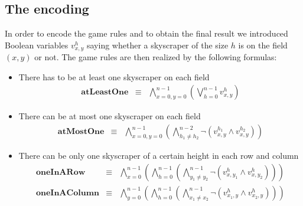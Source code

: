 \documentclass[a4paper, 12pt, titlepage]{article}
\begin{document}
\subsection{The encoding}
In order to encode the game rules and to obtain the final result we introduced Boolean variables $v_{x,y}^h$ saying whether a skyscraper of the size $h$ is on the field $(x,y)$ or not. The game rules are then realized by the following formulas:
	\begin{itemize}
		\item There has to be at least one skyscraper on each field
			\begin{eqnarray}
				\pmb{atLeastOne}&\equiv&\bigwedge_{x=0,y=0}^{n-1} \left(\bigvee_{h=0}^{n-1} v_{x,y}^h \right)
			\end{eqnarray}
		\item There can be at most one skyscraper on each field
			\begin{eqnarray}
				\pmb{atMostOne}&\equiv&\bigwedge_{x=0,y=0}^{n-1} \left( \bigwedge_{h_1\not=h_2}^{n-2}\neg(v_{x,y}^{h_1} \wedge v_{x,y}^{h_2})  \right)
			\end{eqnarray}
		\item There can be only one skyscraper of a certain height in each row and column
			\begin{eqnarray}
				\pmb{oneInARow} &\equiv& \bigwedge_{x=0}^{n-1} \left( \bigwedge_{h=0}^{n-1} \left( \bigwedge_{y_1 \not = y_2}^{n-1} \neg(v_{x,y_1}^h \wedge v_{x,y_2}^h) \right) \right) \\
				\pmb{oneInAColumn} &\equiv&  \bigwedge_{y=0}^{n-1} \left( \bigwedge_{h=0}^{n-1} \left( \bigwedge_{x_1 \not = x_2}^{n-1} \neg(v_{x_1,y}^h \wedge v_{x_2,y}^h) \right) \right)
			\end{eqnarray}
	\end{itemize}
\end{document}
